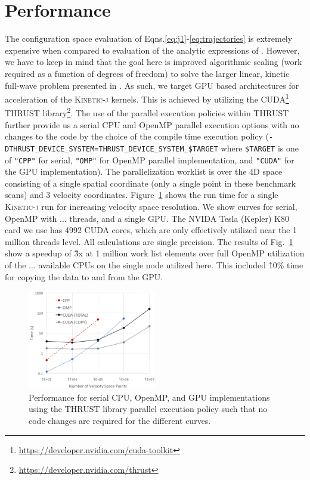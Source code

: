 \documentclass[final,5p,times,twocolumn]{elsarticle}
\newcommand{\kj}{\textsc{Kinetic-j}\xspace}
\begin{document}
\section{Performance}
\label{section:performance}
%
The configuration space evaluation of Eqns.\ref{eq:j1}-\ref{eq:trajectories} is extremely expensive when compared to evaluation of the analytic expressions of \cite{stix}. However, we have to keep in mind that the goal here is improved algorithmic scaling (work required as a function of degrees of freedom) to solve the larger linear, kinetic full-wave problem presented in \cite{green2014}. As such, we target GPU based architectures for acceleration of the \kj kernels. This is achieved by utilizing the CUDA\footnote{\url{https://developer.nvidia.com/cuda-toolkit}} THRUST library\footnote{\url{https://developer.nvidia.com/thrust}}. The use of the parallel execution policies within THRUST further provide us a serial CPU and OpenMP parallel execution options with no changes to the code by the choice of the compile time execution policy (\texttt{-DTHRUST\_DEVICE\_SYSTEM=THRUST\_DEVICE\_SYSTEM\_\$TARGET} where \texttt{\$TARGET} is one of \texttt{"CPP"} for serial, \texttt{"OMP"} for OpenMP parallel implementation, and \texttt{"CUDA"} for the GPU implementation). The parallelization worklist is over the 4D space consisting of a single spatial coordinate (only a single point in these benchmark scans) and 3 velocity coordinates. Figure~\ref{fig:scaling} shows the run time for a single \kj run for increasing velocity space resolution. We show curves for serial, OpenMP with ... threads, and a single GPU. The NVIDA Tesla (Kepler) K80 card we use has 4992 CUDA cores, which are only effectively utilized near the 1 million threads level. All calculations are single precision. The results of Fig.~\ref{fig:scaling} show a speedup of \~3x at 1 million work list elements over full OpenMP utilization of the ... available CPUs on the single node utilized here. This included \~10\% time for copying the data to and from the GPU.  
%
\begin{figure}
\centering
\includegraphics[width=0.5\textwidth]{figures/scaling}
\caption{Performance for serial CPU, OpenMP, and GPU implementations using the THRUST library parallel execution policy such that no code changes are required for the different curves.}
\label{fig:scaling}
\end{figure}
%
\end{document}
